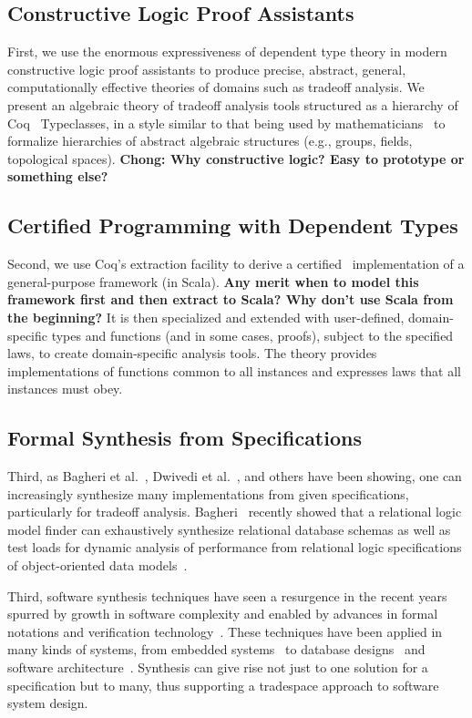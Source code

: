 \subsection{Constructive Logic Proof Assistants}
First, we use the enormous expressiveness of dependent type theory in modern constructive logic proof assistants to produce precise, abstract, general, computationally effective theories of domains such as tradeoff analysis. We present an algebraic theory of tradeoff analysis tools structured as a hierarchy of Coq~\cite{coq_book} Typeclasses, in a style similar to that being used by mathematicians~\cite{spitters2011type, pelayo2014homotopy} to formalize hierarchies of abstract algebraic structures (e.g., groups, fields, topological spaces). \textbf{Chong: Why constructive logic? Easy to prototype or something else?}

\subsection{Certified Programming with Dependent Types}
Second, we use Coq's extraction facility to derive a certified~\cite{chlipala2013certified} implementation of a general-purpose framework (in Scala). \textbf{Any merit when to model this framework first and then extract to Scala? Why don't use Scala from the beginning?} It is then specialized and extended with user-defined, domain-specific types and functions (and in some cases, proofs), subject to the specified laws, to create domain-specific analysis tools. The theory provides implementations of functions common to all instances and expresses laws that all instances must obey.

\subsection{Formal Synthesis from Specifications}
Third, as Bagheri et al.~\cite{trademaker}, Dwivedi et al.~\cite{dwivedi2014model}, and others have been showing, one can increasingly synthesize many implementations from given specifications, particularly for tradeoff analysis. Bagheri~\cite{trademaker} recently showed that a relational logic model finder can exhaustively synthesize relational database schemas as well as test loads for dynamic analysis of performance from relational logic specifications of object-oriented data models~\cite{spacemaker, trademaker}.

Third, software synthesis techniques have seen a resurgence in the recent years spurred by growth in software complexity and enabled by advances in formal notations and verification technology~\cite{Katebi:2011:SAT}. These techniques have been applied in many kinds of systems, from embedded systems~\cite{Schirner:embedded} to database designs~\cite{spacemaker} and software architecture~\cite{dwivedi2014model}. Synthesis can give rise not just to one solution for a specification but to many, thus supporting a tradespace approach to software system design.

